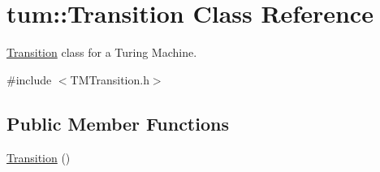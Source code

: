 \hypertarget{classtum_1_1_transition}{\section{tum\-:\-:\-Transition \-Class \-Reference}
\label{classtum_1_1_transition}
}


\hyperlink{classtum_1_1_transition}{\-Transition} class for a \-Turing \-Machine.  




{\ttfamily \#include $<$\-T\-M\-Transition.\-h$>$}

\subsection*{\-Public \-Member \-Functions}
\begin{DoxyCompactItemize}
\item 
\hypertarget{classtum_1_1_transition_aeafb07a1d29496cb6834178df25f7275}{\hyperlink{classtum_1_1_transition_aeafb07a1d29496cb6834178df25f7275}{\-Transition} ()}\label{classtum_1_1_transition_aeafb07a1d29496cb6834178df25f7275}


\end{DoxyCompactItemize}
